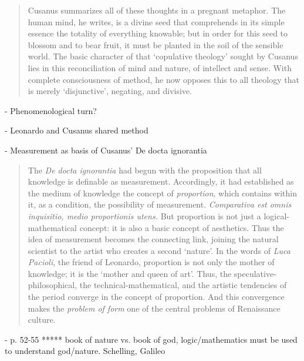 \begin{quote}
    Cusanus summarizes all of these thoughts in a pregnant metaphor.  The human mind, he writes, is a divine seed that comprehends in its simple essence the totality of everything knowable; but in order for this seed to blossom and to bear fruit, it must be planted in the soil of the sensible world.  The basic character of that `copulative theology' sought by Cusanus lies in this reconciliation of mind and nature, of intellect and sense.  With complete consciousness of method, he now opposes this to all theology that is merely `disjunctive', negating, and divisive.

    \citep[p. 44-45]{Cassirer1927}
\end{quote}

- Phenomenological turn?


- Leonardo and Cusanus shared method

- Measurement as basis of Cusanus' De docta ignorantia

\begin{quote}
    The \emph{De docta ignorantia} had begun with the proposition that all knowledge is definable as measurement.  Accordingly, it had established as the medium of knowledge the concept of \emph{proportion}, which contains within it, as a condition, the possibility of measurement.  \emph{Comparativa est omnis inquisitio, medio proportionis utens.}  But proportion is not just a logical-mathematical concept: it is also a basic concept of aesthetics.  Thus the idea of measurement becomes the connecting link, joining the natural scientist to the artist who creates a second `nature'.  In the words of \emph{Luca Pacioli}, the friend of Leonardo, proportion is not only the mother of knowledge; it is the `mother and queen of art'.  Thus, the speculative-philosophical, the technical-mathematical, and the artistic tendencies of the period converge in the concept of proportion.  And this convergence makes the \emph{problem of form} one of the central problems of Renaissance culture.

    \citep[p. 51]{Cassirer1927}
\end{quote}

- p. 52-55 ***** book of nature vs. book of god, logic/mathematics must be used to understand god/nature.  Schelling, Galileo

